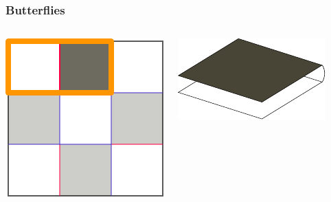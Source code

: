 \documentclass{beamer}
\begin{document}
\begin{frame}
\frametitle{Butterflies}

\begin{columns}[c]

\includegraphics[width=\textwidth]{sam_images/map-w-butterfly-1.pdf}

\includegraphics[width=\textwidth]{sam_images/checkerboard-3a.pdf}

\end{columns}

\end{frame}

\end{document}
